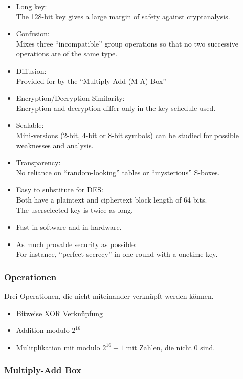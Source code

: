\begin{itemize}
\tightlist
\item
  Long key:\\
  The 128-bit key gives a large margin of safety against cryptanalysis.
\item
  Confusion:\\
  Mixes three ``incompatible'' group operations so that no two
  successive operations are of the same type.
\item
  Diffusion:\\
  Provided for by the ``Multiply-Add (M-A) Box''
\item
  Encryption/Decryption Similarity:\\
  Encryption and decryption differ only in the key schedule used.
\item
  Scalable:\\
  Mini-versions (2-bit, 4-bit or 8-bit symbols) can be studied for
  possible weaknesses and analysis.
\item
  Transparency:\\
  No reliance on ``random-looking'' tables or ``mysterious'' S-boxes.
\item
  Easy to substitute for DES:\\
  Both have a plaintext and ciphertext block length of 64 bits.\\
  The userselected key is twice as long.
\item
  Fast in software and in hardware.
\item
  As much provable security as possible:\\
  For instance, ``perfect secrecy'' in one-round with a onetime key.
\end{itemize}

\hypertarget{operationen}{%
\subsubsection{Operationen}\label{operationen}}

Drei Operationen, die nicht miteinander verknüpft werden können. 
\begin{itemize}
    \item Bitweise XOR Verknüpfung
    \item Addition modulo $2^{16}$
    \item Mulitplikation mit modulo $2^{16}+1$ mit Zahlen, die nicht 0 sind.
\end{itemize}

\hypertarget{multiply-add-box}{%
\subsubsection{Multiply-Add Box}\label{multiply-add-box}}

